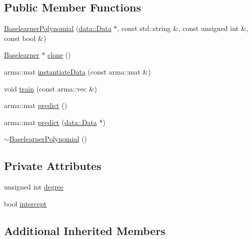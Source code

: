 \subsection*{Public Member Functions}
\begin{DoxyCompactItemize}
\item 
\mbox{\hyperlink{classblearner_1_1_baselearner_polynomial_aba0f1e5bf9566dc7bc674c9d30b44af6}{Baselearner\+Polynomial}} (\mbox{\hyperlink{classdata_1_1_data}{data\+::\+Data}} $\ast$, const std\+::string \&, const unsigned int \&, const bool \&)
\item 
\mbox{\hyperlink{classblearner_1_1_baselearner}{Baselearner}} $\ast$ \mbox{\hyperlink{classblearner_1_1_baselearner_polynomial_a4afd811448bd6d387b721cc48b84da26}{clone}} ()
\item 
arma\+::mat \mbox{\hyperlink{classblearner_1_1_baselearner_polynomial_aacd6ba3b09ccf63a96d7bffa1d703710}{instantiate\+Data}} (const arma\+::mat \&)
\item 
void \mbox{\hyperlink{classblearner_1_1_baselearner_polynomial_af8bc28904ebce13e78d0e4a361725f26}{train}} (const arma\+::vec \&)
\item 
arma\+::mat \mbox{\hyperlink{classblearner_1_1_baselearner_polynomial_ad45b97c416ac06755c617b671cfbdb76}{predict}} ()
\item 
arma\+::mat \mbox{\hyperlink{classblearner_1_1_baselearner_polynomial_a8aee40269b2b4dabdd81cebe5b4f2488}{predict}} (\mbox{\hyperlink{classdata_1_1_data}{data\+::\+Data}} $\ast$)
\item 
\mbox{\hyperlink{classblearner_1_1_baselearner_polynomial_abb799eceb2808fcca4c8041e2ae7abe4}{$\sim$\+Baselearner\+Polynomial}} ()
\end{DoxyCompactItemize}
\subsection*{Private Attributes}
\begin{DoxyCompactItemize}
\item 
unsigned int \mbox{\hyperlink{classblearner_1_1_baselearner_polynomial_a6841e90a66b12f3f345f6e563df78baf}{degree}}
\item 
bool \mbox{\hyperlink{classblearner_1_1_baselearner_polynomial_af72326177abcf1fae10a32f9dfdd6a6e}{intercept}}
\end{DoxyCompactItemize}
\subsection*{Additional Inherited Members}


